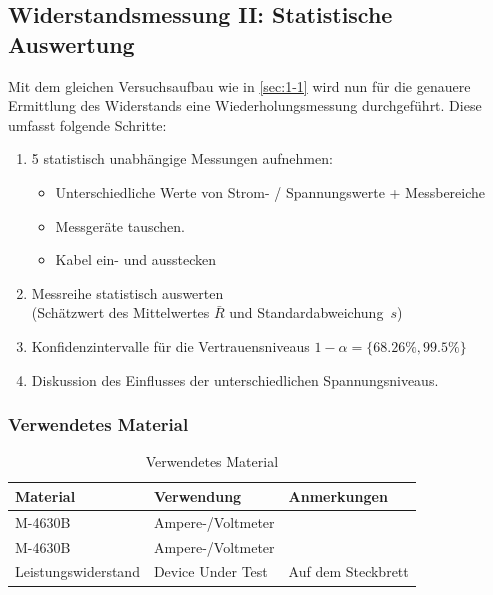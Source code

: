 \subsection{Widerstandsmessung II: Statistische Auswertung}\label{sec:1-2}

\begin{highlightblock}
	Mit dem gleichen Versuchsaufbau wie in \autoref{sec:1-1} wird nun
	für die genauere Ermittlung des Widerstands eine Wiederholungsmessung
	durchgeführt. Diese umfasst folgende Schritte:
	\begin{enumerate}[label=\textbf{\alph*:}, ref=\alph*,noitemsep]
		\item\label{itm:1-P2-1} 5 statistisch unabhängige Messungen aufnehmen:
		      \begin{itemize}[noitemsep]
			      \item Unterschiedliche Werte von Strom- / Spannungswerte + Messbereiche
			      \item Messgeräte tauschen.
			      \item Kabel ein- und ausstecken
		      \end{itemize}
		\item\label{itm:1-P2-2} Messreihe statistisch auswerten\\(Schätzwert des Mittelwertes $\bar{R}$ und Standardabweichung~$s$)
		\item\label{itm:1-P2-3} Konfidenzintervalle für die Vertrauensniveaus $1-\alpha =\{68.26\%, 99.5\%\}$
		\item\label{itm:1-P2-4} Diskussion des Einflusses der unterschiedlichen Spannungsniveaus.
	\end{enumerate}
\end{highlightblock}

\subsubsection{Verwendetes Material}

\begin{table}[h]
	\centering
	\caption{Verwendetes Material}
	\begin{tabularx}{\textwidth}{XXX}
		\textbf{Material}   & \textbf{Verwendung} & \textbf{Anmerkungen} \\ \midrule
		M-4630B             & Ampere-/Voltmeter   &                      \\
		M-4630B             & Ampere-/Voltmeter   &                      \\
		Leistungswiderstand & Device Under Test   & Auf dem Steckbrett   \\
	\end{tabularx}
\end{table}

